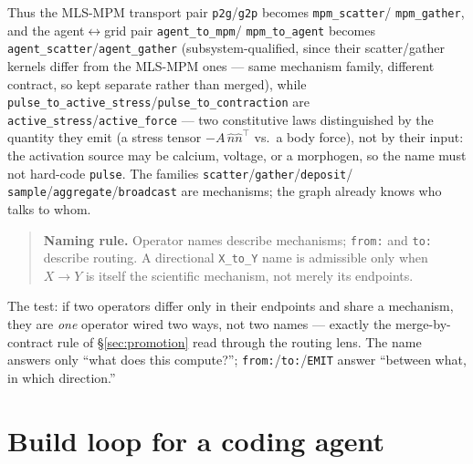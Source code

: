 \documentclass[11pt]{article}
\newcommand{\code}[1]{\texttt{#1}}
\begin{document}
Thus the MLS-MPM transport pair \code{p2g}/\code{g2p} becomes \code{mpm\_scatter}/
\code{mpm\_gather}, and the agent$\leftrightarrow$grid pair \code{agent\_to\_mpm}/
\code{mpm\_to\_agent} becomes \code{agent\_scatter}/\code{agent\_gather} (subsystem-qualified,
since their scatter/gather kernels differ from the MLS-MPM ones --- same mechanism family,
different contract, so kept separate rather than merged), while
\code{pulse\_to\_active\_stress}/\code{pulse\_to\_contraction}
are \code{active\_stress}/\code{active\_force} --- two constitutive laws distinguished by
the quantity they emit (a stress tensor $-A\,\hat n\hat n^{\!\top}$ vs.\ a body force), not
by their input: the activation source may be calcium, voltage, or a morphogen, so the name
must not hard-code \code{pulse}. The families \code{scatter}/\code{gather}/\code{deposit}/
\code{sample}/\code{aggregate}/\code{broadcast} are mechanisms; the graph already knows who
talks to whom.

\begin{quote}
\textbf{Naming rule.} Operator names describe mechanisms; \code{from:} and \code{to:}
describe routing. A directional \code{X\_to\_Y} name is admissible only when $X\!\to\!Y$
is itself the scientific mechanism, not merely its endpoints.
\end{quote}

The test: if two operators differ only in their endpoints and share a mechanism, they are
\emph{one} operator wired two ways, not two names --- exactly the merge-by-contract rule of
\S\ref{sec:promotion} read through the routing lens. The name answers only ``what does this
compute?''; \code{from:}/\code{to:}/\code{EMIT} answer ``between what, in which direction.''

\section{Build loop for a coding agent}
\end{document}
